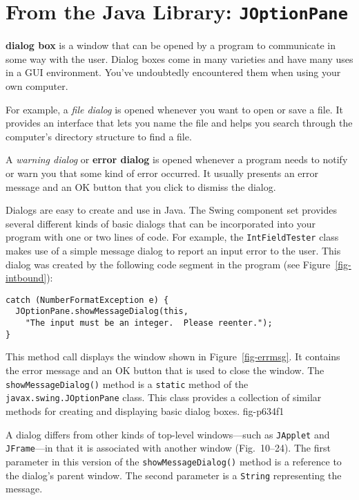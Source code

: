 \section{From the Java Library: {\tt JOptionPane}}
\label{sec-dialogs}\label{pg-sec-dialogs}

 {\bf dialog box} is a window that can be opened by a program to
communicate in some way with the user.   Dialog boxes come in many
varieties and have many uses in a GUI environment.  You've undoubtedly
encountered them when using your own computer.

For example, a {\it file dialog} is opened whenever you want to open
or save a file.  It provides an interface that lets you name the file
\WWWjava
and helps you search through the computer's directory structure to
find a file.


A {\it warning dialog} or {\bf error dialog} is opened whenever a
program needs to notify or warn you that some kind of error
occurred.  It usually presents an error message and an OK button that
you click to dismiss the dialog.


Dialogs are easy to create and use in Java.  The Swing component set
provides several different kinds of basic dialogs that can be
incorporated into your program with one or two lines of code.  For
example, the {\tt IntFieldTester} class makes use of a simple message
dialog to report an input error to the user.   This dialog was created
by the following code segment in the program (see
Figure~\ref{fig-intbound}):

\begin{jjjlisting}
\begin{lstlisting}
catch (NumberFormatException e) {
  JOptionPane.showMessageDialog(this,
    "The input must be an integer.  Please reenter.");
}
\end{lstlisting}
\end{jjjlisting}

\noindent This method call displays the window shown in
Figure~\ref{fig-errmsg}. It contains the error message and an
OK button that is used to close the window.  The
{\tt showMessageDialog()} method is a {\tt static} method of the
{\tt javax.swing.J\-OptionPane} class.  This class provides a
collection of similar methods for creating and displaying basic dialog
boxes.
{fig-p634f1}


A dialog differs from other kinds of top-level windows---such as
{\tt JApplet} and {\tt JFrame}---in that it is associated with
another window (Fig.~10\mbox{--}24).  The first parameter in this
version of the {\tt showMessageDialog()} method is a reference to the
dialog's parent window.  The second parameter is a {\tt String}
representing the message.

